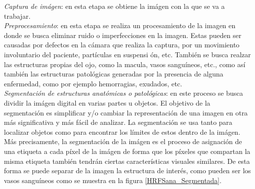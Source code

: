 \textit{Captura de im\'agen}: en esta etapa se obtiene la im\'agen con la que se va a trabajar.\\
\textit{Preprocesamiento}: en esta etapa se realiza un procesamiento de la imagen en donde se busca eliminar ruido o imperfecciones en la imagen. Estas pueden ser causadas por defectos en la c\'amara que realiza la captura, por un movimiento involuntario del paciente, part\'iculas en suspensi \'on, etc. Tambi\'en se busca realzar las estructuras propias del ojo, como la macula, vasos sangu\'ineos, etc.,  como as\'i tambi\'en las estructuras patol\'ogicas generadas por la presencia de alguna enfermedad, como por ejemplo hemorragias, exudados, etc.\\ 
\textit{Segmentaci\'on de estructuras anat\'omicas  o patol\'ogicas}: en este proceso se busca dividir la im\'agen digital en varias partes u objetos. El objetivo de la segmentación es simplificar y/o cambiar la representaci\'on de una imagen en otra m\'as significativa y m\'as f\'acil de analizar. La segmentaci\'on se usa tanto para localizar objetos como para encontrar los l\'imites de estos dentro de la im\'agen. M\'as precisamente, la segmentaci\'on de la im\'agen es el proceso de asignaci\'on de una etiqueta a cada p\'ixel de la im\'agen de forma que los p\'ixeles que compartan la misma etiqueta tambi\'en tendr\'an ciertas caracter\'isticas visuales similares. De esta forma se puede separar de la imagen la estructura de inter\'es, como pueden ser los vasos sangu\'ineos como se muestra en la figura \ref{HRFSana_Segmentada}.

